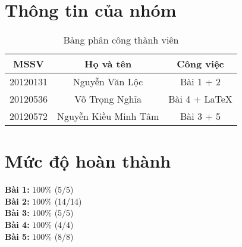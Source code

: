 \section{Thông tin của nhóm}
\begin{table}[H]
\begin{center}
\begin{tabular}{|c|c|c|}
\hline 
MSSV & Họ và tên & Công việc \\ 
\hline 
20120131 & Nguyễn Văn Lộc & Bài 1 + 2 \\ 
\hline 
20120536 & Võ Trọng Nghĩa & Bài 4 + \LaTeX \\ 
\hline 
20120572 & Nguyễn Kiều Minh Tâm & Bài 3 + 5 \\ 
\hline 
\end{tabular}
\caption{Bảng phân công thành viên} 
\end{center}
\end{table}

\section{Mức độ hoàn thành}
\textbf{Bài 1:} $100\%$ (5/5)\\
\textbf{Bài 2:} $100\%$ (14/14)\\
\textbf{Bài 3:} $100\%$ (5/5)\\
\textbf{Bài 4:} $100\%$ (4/4)\\
\textbf{Bài 5:} $100\%$ (8/8)\\